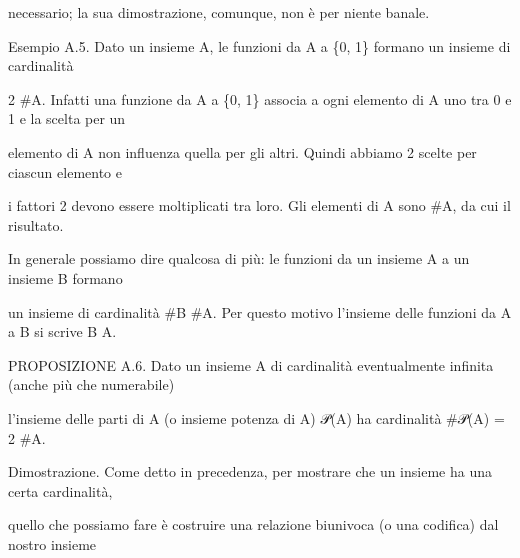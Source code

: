 \documentclass[a4paper,portrait,12pt]{article}
\begin{document}
\begin{flushleft}
necessario; la sua dimostrazione, comunque, non \`{e} per niente banale.
\end{flushleft}


\begin{flushleft}
Esempio A.5. Dato un insieme A, le funzioni da A a \{0, 1\} formano un insieme di cardinalit\`{a}
\end{flushleft}


\begin{flushleft}
2 \#A. Infatti una funzione da A a \{0, 1\} associa a ogni elemento di A uno tra 0 e 1 e la scelta per un
\end{flushleft}


\begin{flushleft}
elemento di A non influenza quella per gli altri. Quindi abbiamo 2 scelte per ciascun elemento e
\end{flushleft}


\begin{flushleft}
i fattori 2 devono essere moltiplicati tra loro. Gli elementi di A sono \#A, da cui il risultato.
\end{flushleft}


\begin{flushleft}
In generale possiamo dire qualcosa di più: le funzioni da un insieme A a un insieme B formano
\end{flushleft}


\begin{flushleft}
un insieme di cardinalit\`{a} \#B \#A. Per questo motivo l'insieme delle funzioni da A a B si scrive B A.
\end{flushleft}


\begin{flushleft}
PROPOSIZIONE A.6. Dato un insieme A di cardinalit\`{a} eventualmente infinita (anche più che numerabile)
\end{flushleft}


\begin{flushleft}
l'insieme delle parti di A (o insieme potenza di A) 𝒫(A) ha cardinalit\`{a} \#𝒫(A) = 2 \#A.
\end{flushleft}


\begin{flushleft}
Dimostrazione. Come detto in precedenza, per mostrare che un insieme ha una certa cardinalit\`{a},
\end{flushleft}


\begin{flushleft}
quello che possiamo fare \`{e} costruire una relazione biunivoca (o una codifica) dal nostro insieme
\end{flushleft}
\end{document}
